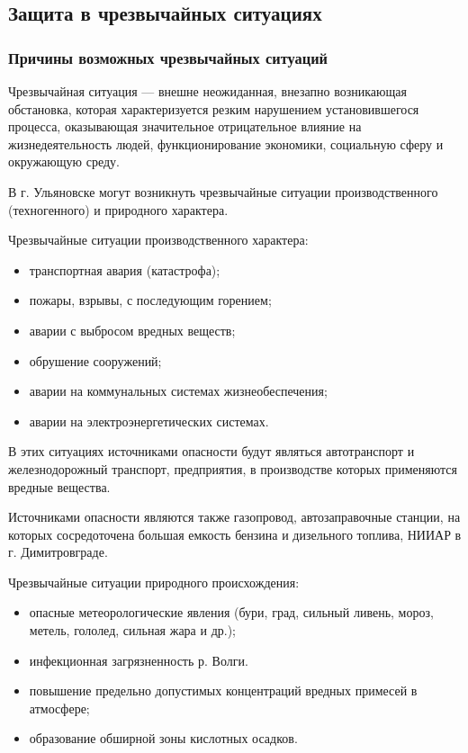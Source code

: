 \subsection{Защита в чрезвычайных ситуациях}

\subsubsection{Причины возможных чрезвычайных ситуаций}
Чрезвычайная ситуация --- внешне неожиданная, внезапно возникающая обстановка, которая характеризуется резким нарушением установившегося процесса, оказывающая значительное отрицательное влияние на жизнедеятельность людей, функционирование экономики, социальную сферу и окружающую среду.

В г. Ульяновске могут возникнуть чрезвычайные ситуации производственного (техногенного) и природного характера.

Чрезвычайные ситуации производственного характера:
\begin{itemize}
  \item транспортная авария (катастрофа);
  \item пожары, взрывы, с последующим горением;
  \item аварии с выбросом вредных веществ;
  \item обрушение сооружений;
  \item аварии на коммунальных системах жизнеобеспечения;
  \item аварии на электроэнергетических системах.
\end{itemize}

В этих ситуациях источниками опасности будут являться автотранспорт и железнодорожный транспорт, предприятия, в производстве которых применяются вредные вещества.

Источниками опасности являются также газопровод, автозаправочные станции, на которых сосредоточена большая емкость бензина и дизельного топлива, НИИАР в г. Димитровграде.

Чрезвычайные ситуации природного происхождения:
\begin{itemize}
  \item опасные метеорологические явления (бури, град, сильный ливень, мороз, метель, гололед, сильная жара и др.);
  \item инфекционная загрязненность р. Волги.
  \item повышение предельно допустимых концентраций вредных примесей в атмосфере;
  \item образование обширной зоны кислотных осадков.
\end{itemize}


